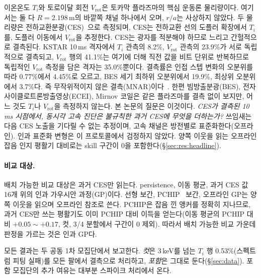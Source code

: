 \documentclass[10pt,twocolumn,letterpaper]{article}
\newcommand{\Ti}{\ensuremath{T_i}}
\newcommand{\Vrot}{\ensuremath{V_\mathrm{rot}}}
\begin{document}
이온온도 \Ti{}와 토로이달 회전 \Vrot{}은 토카막 플라즈마의 핵심 운동론 물리량이다. 여기서는
둘 다 $R = 2.198$\,m의 바깥쪽 채널 하나에서 오며, $r/a$는 사상하지 않았다. 두 물리량은 전하교환분광(CES)~\citep{Ko2010ChargeExchange}으로
측정되며, CES는 전하교환 선의 도플러 확장에서 \Ti{}를, 도플러 이동에서 \Vrot{}을
추정한다. CES는 광자를 적분해야 하므로 느리고 간헐적으로 결측된다. KSTAR 10\,ms
격자에서 \Ti{} 관측의 8.2\%, \Vrot{} 관측의 23.9\%가 서로 독립적으로 결측되고,
\Vrot{} 행의 41.1\%는 여기에 더해 직전 값을 비트 단위로 반복하므로 독립적인 \Vrot{}
측정을 담은 격자는 35.0\%뿐이다. 결측률은 인접 스텝 변화의 오분위를 따라 0.77\%에서
4.45\%로 오르고, BES 세기 최하위 오분위에서 19.9\%, 최상위 오분위에서 3.7\%다. 즉
무작위적이지 않은 결측(MNAR)이다~\citep{Little2002StatisticalAnalysis}. 한편
빔방출분광(BES), 전자사이클로트론방출영상(ECEI), Mirnov 코일은 같은 플라즈마를 결측 없이
보지만, 어느 것도 \Ti{}나 \Vrot{}을 측정하지 않는다. 본 논문의 질문은 이것이다.
\emph{CES가 결측된 10\,ms 시점에서, 동시각 고속 진단은 불규칙한 과거 CES에 무엇을
더하는가?} 쓰임새는 다음 CES 노출을 기다릴 수 없는 추정이며, 고속 채널은 방전별로
표준화한다(오프라인). 인과 표준화 변형은 이 프로토콜에서 검정하지 않았다. 양쪽 이웃을 읽는 오프라인 잡음 인지
평활기 대비로는 skill 구간이 0을 포함한다(\S\ref{sec:res:headline}).

\paragraph{비교 대상.}
배치 가능한 비교 대상은 과거 CES만 읽는다. persistence, 이동 평균, 과거 CES 값 16개 위의
인과 가우시안 과정(GP)이다. 선형 보간, PCHIP~\citep{fritsch1980} 보간, 오프라인 GP는 양쪽
이웃을 읽으며 오프라인 참조로 쓴다. PCHIP은 잡음 낀 앵커를 정확히 지나므로, 과거 CES만 쓰는
평활기도 이미 PCHIP 대비 이득을 얻는다(이동 평균의 PCHIP 대비 $+0.05\sim+0.17$, 컷, 3/4
분할에서 구간이 0 제외). 따라서 배치 가능한 비교 가운데 판정을 가르는 것은 인과 GP다.

모든 결과는 두 공동 1차 모집단에서 보고한다. \emph{컷}은 3\,keV를 넘는 \Ti{} 행
0.53\%(스펙트럼 피팅 실패)를 모든 팔에서 결측으로 처리하고, \emph{포함}은 그대로
둔다(\S\ref{sec:data}). 포함 모집단의 추가 여유는 대부분 스파이크 처리에서 온다.
\end{document}

